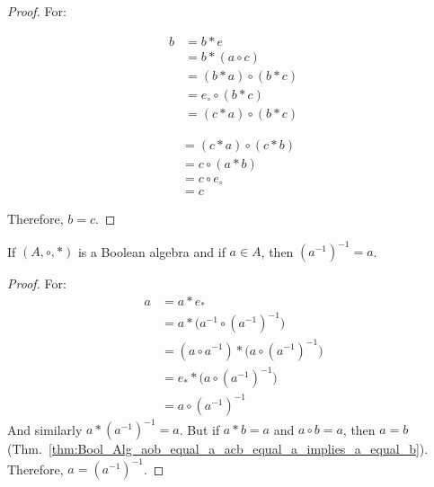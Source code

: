     \begin{proof}
        For:
        \par
        \begin{minipage}[t]{0.49\textwidth}
            \centering
            \begin{align}
                b&=b*e
                \tag{Identity}\\
                &=b*(a\circ{c})
                \tag{Complement}\\
                &=(b*a)\circ(b*c)
                \tag{Distributivity}\\
                &=e_{\circ}\circ(b*c)
                \tag{Complement}\\
                &=(c*a)\circ(b*c)
                \tag{Complement}
            \end{align}
        \end{minipage}
        \hfill
        \begin{minipage}[t]{0.49\textwidth}
            \centering
            \begin{align}
                &=(c*a)\circ(c*b)
                \tag{Commutativity}\\
                &=c\circ(a*b)
                \tag{Distributivity}\\
                &=c\circ{e}_{\circ}
                \tag{Complement}\\
                &=c
                \tag{Identity}
            \end{align}
        \end{minipage}
        \par\vspace{2.5ex}
        Therefore, $b=c$.
    \end{proof}
    \begin{theorem}
        If $(A,\circ,*)$ is a Boolean algebra and if $a\in{A}$,
        then $(a^{\minus{1}})^{\minus{1}}=a$.
    \end{theorem}
    \begin{proof}
        For:
        \begin{align}
            a&=a*e_{*}
            \tag{Identity}\\
            &=a*\big(a^{\minus{1}}\circ(a^{\minus{1}})^{\minus{1}})
            \tag{Complement}\\
            &=(a\circ{a}^{\minus{1}})*
                \big(a\circ(a^{\minus{1}})^{\minus{1}}\big)
            \tag{Distributivity}\\
            &=e_{*}*\big(a\circ(a^{\minus{1}})^{\minus{1}}\big)
            \tag{Complement}\\
            &=a\circ(a^{\minus{1}})^{\minus{1}}
            \tag{Identity}
        \end{align}
        And similarly $a*(a^{\minus{1}})^{\minus{1}}=a$. But if $a*b=a$ and
        $a\circ{b}=a$, then $a=b$
        (Thm.~\ref{thm:Bool_Alg_aob_equal_a_acb_equal_a_implies_a_equal_b}).
        Therefore, $a=(a^{\minus{1}})^{\minus{1}}$.
    \end{proof}
